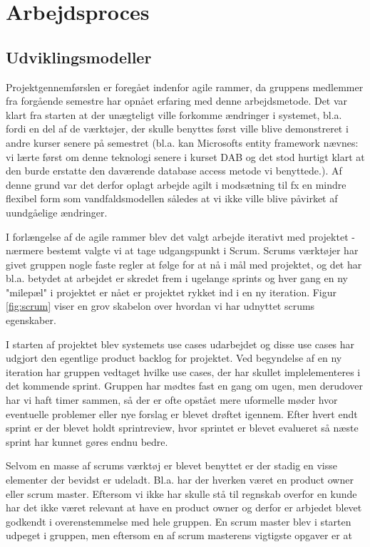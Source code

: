 \section{Arbejdsproces}

\subsection{Udviklingsmodeller}
Projektgennemførslen er foregået indenfor agile rammer, da gruppens medlemmer fra forgående semestre har opnået erfaring med denne arbejdsmetode. Det var klart fra starten at der unægteligt ville forkomme ændringer i systemet, bl.a. fordi en del af de værktøjer, der skulle benyttes først ville blive demonstreret i andre kurser senere på semestret (bl.a. kan Microsofts entity framework nævnes: vi lærte først om denne teknologi senere i kurset DAB og det stod hurtigt klart at den burde erstatte den daværende database access metode vi benyttede.). Af denne grund var det derfor oplagt arbejde agilt i modsætning til fx en mindre flexibel form som vandfaldsmodellen således at vi ikke ville blive påvirket af uundgåelige ændringer.

I forlængelse af de agile rammer blev det valgt arbejde iterativt med projektet - nærmere bestemt valgte vi at tage udgangspunkt i Scrum. Scrums værktøjer har givet gruppen nogle faste regler at følge for at nå i mål med projektet, og det har bl.a. betydet at arbejdet er skredet frem i ugelange sprints og hver gang en ny "milepæl" i projektet er nået er projektet rykket ind i en ny iteration. Figur \ref{fig:scrum} viser en grov skabelon over hvordan vi har udnyttet scrums egenskaber. 


I starten af projektet blev systemets use cases udarbejdet og disse use cases har udgjort den egentlige product backlog for projektet. Ved begyndelse af en ny iteration har gruppen vedtaget hvilke use cases, der har skullet implelementeres i det kommende sprint. Gruppen har mødtes fast en gang om ugen, men derudover har vi haft timer sammen, så der er ofte opstået mere uformelle møder hvor eventuelle problemer eller nye forslag er blevet drøftet igennem. Efter hvert endt sprint er der blevet holdt sprintreview, hvor sprintet er blevet evalueret så næste sprint har kunnet gøres endnu bedre.   

Selvom en masse af scrums værktøj er blevet benyttet er der stadig en visse elementer der bevidst er udeladt. Bl.a. har der hverken været en product owner eller scrum master.  Eftersom vi ikke har skulle stå til regnskab overfor en kunde har det ikke været relevant at have en product owner og derfor er arbjedet blevet godkendt i overenstemmelse med hele gruppen. En scrum master blev i starten udpeget i gruppen, men eftersom en af scrum masterens vigtigste opgaver er at 


